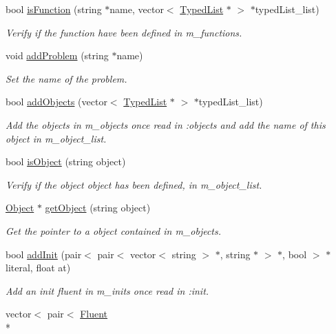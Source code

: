 \begin{DoxyCompactItemize}
bool \hyperlink{classData_a62ef476f066455ffd3e5d9f2ffde145f}{is\+Function} (string $\ast$name, vector$<$ \hyperlink{classTypedList}{Typed\+List} $\ast$ $>$ $\ast$typed\+List\+\_\+list)
\begin{DoxyCompactList}\small\item\em Verify if the function have been defined in m\+\_\+functions. \end{DoxyCompactList}\item 
void \hyperlink{classData_a4ef55d895e6eefe77091a154edf4614d}{add\+Problem} (string $\ast$name)
\begin{DoxyCompactList}\small\item\em Set the name of the problem. \end{DoxyCompactList}\item 
bool \hyperlink{classData_af3f253e6aac97be58347b71b977dab83}{add\+Objects} (vector$<$ \hyperlink{classTypedList}{Typed\+List} $\ast$ $>$ $\ast$typed\+List\+\_\+list)
\begin{DoxyCompactList}\small\item\em Add the objects in m\+\_\+objects once read in \+:objects and add the name of this object in m\+\_\+object\+\_\+list. \end{DoxyCompactList}\item 
bool \hyperlink{classData_a850db73b9a3cfada1e204853a66222dd}{is\+Object} (string object)
\begin{DoxyCompactList}\small\item\em Verify if the object object has been defined, in m\+\_\+object\+\_\+list. \end{DoxyCompactList}\item 
\hyperlink{classObject}{Object} $\ast$ \hyperlink{classData_a7e021783ede1baa1bfea1023d181755f}{get\+Object} (string object)
\begin{DoxyCompactList}\small\item\em Get the pointer to a object contained in m\+\_\+objects. \end{DoxyCompactList}\item 
bool \hyperlink{classData_a27908a242e9862807ee0ab5cb0fd26de}{add\+Init} (pair$<$ pair$<$ vector$<$ string $>$ $\ast$, string $\ast$ $>$ $\ast$, bool $>$ $\ast$literal, float at)
\begin{DoxyCompactList}\small\item\em Add an init fluent in m\+\_\+inits once read in \+:init. \end{DoxyCompactList}\item 
vector$<$ pair$<$ \hyperlink{classFluent}{Fluent} \\*

\end{DoxyCompactItemize}
